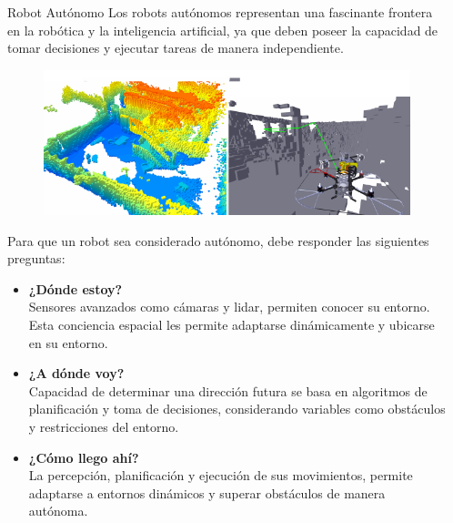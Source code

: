 \documentclass[final]{beamer}
\newlength{\sepwidth}
\newlength{\colwidth}
\newcommand{\separatorcolumn}{\begin{column}{\sepwidth}\end{column}}
\begin{document}
\begin{frame}[t]
\begin{columns}[t]
\begin{column}{\colwidth}
  \begin{block}{\color{teal}Robot Autónomo}
    Los robots autónomos representan una fascinante frontera en la robótica y la inteligencia artificial, ya que deben poseer la capacidad de tomar decisiones y ejecutar tareas de manera independiente.
    \begin{figure}
      \centering
      \includegraphics[width=40cm]{images/auto_dro.png}
    \end{figure}

    Para que un robot sea considerado autónomo, debe responder las siguientes preguntas:
    \begin{multicols}{3}
      \begin{itemize}
      \item \textbf{¿Dónde estoy?}\\
        Sensores avanzados como cámaras y lidar, permiten conocer su entorno.\\
        Esta conciencia espacial les permite adaptarse dinámicamente y ubicarse en su entorno.\vspace{1cm}
      \item \textbf{¿A dónde voy?}\\
        Capacidad de determinar una dirección futura se basa en algoritmos de planificación y toma de decisiones, considerando variables como obstáculos y restricciones del entorno.\vspace{1cm}
      \item \textbf{¿Cómo llego ahí?}\\
        La percepción, planificación y ejecución de sus movimientos, permite adaptarse a entornos dinámicos y superar obstáculos de manera autónoma.
      \end{itemize}
    \end{multicols}
  \end{block}
\end{column}

\separatorcolumn


\end{columns}
\end{frame}
\end{document}
